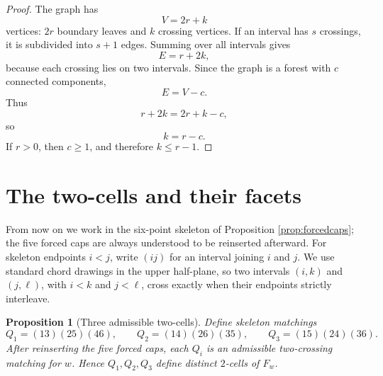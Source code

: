 \documentclass[12pt]{article}
\newtheorem{proposition}[theorem]{Proposition}
\theoremstyle{definition}
\begin{document}
\begin{proof}
The graph has
\[
V=2r+k
\]
vertices: \(2r\) boundary leaves and \(k\) crossing vertices.  If an interval has \(s\) crossings, it is subdivided into \(s+1\) edges.  Summing over all intervals gives
\[
E=r+2k,
\]
because each crossing lies on two intervals.  Since the graph is a forest with \(c\) connected components,
\[
E=V-c.
\]
Thus
\[
r+2k=2r+k-c,
\]
so
\[
k=r-c.
\]
If \(r>0\), then \(c\ge 1\), and therefore \(k\le r-1\).
\end{proof}

\section{The two-cells and their facets}

From now on we work in the six-point skeleton of Proposition \ref{prop:forcedcaps}; the five forced caps are always understood to be reinserted afterward.  For skeleton endpoints \(i<j\), write \((ij)\) for an interval joining \(i\) and \(j\).  We use standard chord drawings in the upper half-plane, so two intervals \((i,k)\) and \((j,\ell)\), with \(i<k\) and \(j<\ell\), cross exactly when their endpoints strictly interleave.

\begin{proposition}[Three admissible two-cells]\label{prop:twocells}
Define skeleton matchings
\[
Q_1=(13)(25)(46),\qquad
Q_2=(14)(26)(35),\qquad
Q_3=(15)(24)(36).
\]
After reinserting the five forced caps, each \(Q_i\) is an admissible two-crossing matching for \(w\).  Hence \(Q_1,Q_2,Q_3\) define distinct \(2\)-cells of \(F_w\).
\end{proposition}
\end{document}
